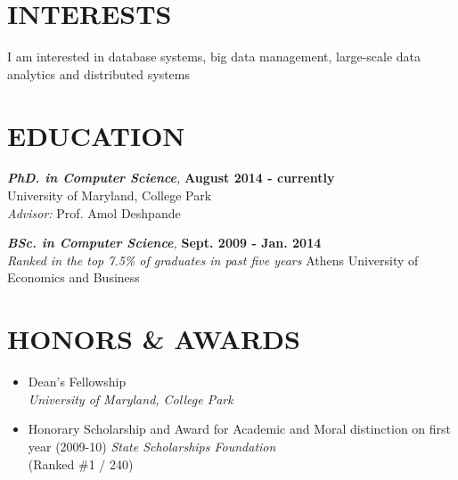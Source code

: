\documentclass[margin, 10pt]{res} %
\begin{document}
\begin{resume}


\section{INTERESTS}

I am interested in database systems, big data management, large-scale data analytics and distributed systems


\section{EDUCATION}

{\sl \textbf{PhD. in Computer Science},}  \hfill \textbf{August 2014 - currently} \\
University of Maryland, College Park\\
\textit{Advisor:} Prof. Amol Deshpande

{\sl \textbf{BSc. in Computer Science},}  \hfill \textbf{Sept. 2009 - Jan. 2014} \\
\textit{Ranked in the top 7.5\% of graduates in past five years}
Athens University of Economics and Business\\


\section{HONORS \& AWARDS}

\begin{itemize}
  \item Dean's Fellowship \\
  \textit{University of Maryland, College Park}
  \item Honorary Scholarship and Award for Academic and Moral distinction on first year (2009-10)
 \textit{State Scholarships Foundation}\\
 (Ranked \#1 / 240)
\end{itemize}


\end{resume}
\end{document}

